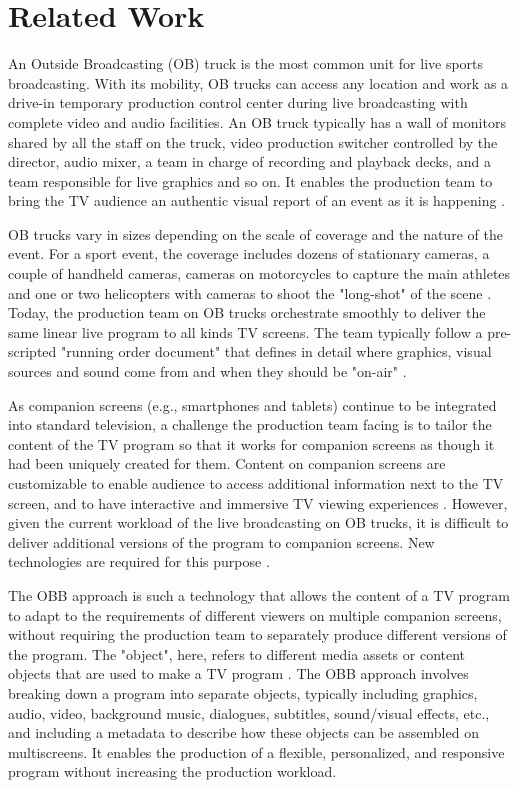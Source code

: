 \documentclass[sigchi-a, authorversion]{acmart}
\begin{document}
\section{Related Work}
An Outside Broadcasting (OB) truck is the most common unit for live sports
broadcasting. With its mobility, OB trucks can access any location and work as
a drive-in temporary production control center during live broadcasting with
complete video and audio facilities. An OB truck typically has a wall of monitors
shared by all the staff on the truck, video production switcher controlled by
the director, audio mixer, a team in charge of recording and playback decks, and
a team responsible for live graphics and so on. It enables the production team
to bring the TV audience an authentic visual report of an event as it is
happening \cite{owens2012, owens2015}.

OB trucks vary in sizes depending on the scale of coverage and the nature of the
event. For a sport event, the coverage includes dozens of stationary cameras, a
couple of handheld cameras, cameras on motorcycles to capture the main athletes
and one or two helicopters with cameras to shoot the "long-shot" of the
scene \cite{owens2012, Li:2018_TVX}. Today, the production team on OB trucks
orchestrate smoothly to deliver the same linear live program to all kinds TV
screens. The team typically follow a pre-scripted "running order document" that
defines in detail where graphics, visual sources and sound come from and when
they should be "on-air" \cite{Li:2018_TVX}.

As companion screens (e.g., smartphones and tablets) continue to be integrated
into standard television, a challenge the production team facing is to tailor
the content of the TV program so that it works for companion screens as though
it had been uniquely created for them. Content on companion screens are
customizable to enable audience to access additional information next to the TV
screen, and to have interactive and immersive TV viewing
experiences \cite{bentley2017, dowell2015}. However, given the current workload
of the live broadcasting on OB trucks, it is difficult to deliver additional
versions of the program to companion screens. New technologies are required for
this purpose \cite{Li:2018_TVX, armstrong2014}.

The OBB approach is such a technology that allows the content of a TV program to
adapt to the requirements of different viewers on multiple companion screens,
without requiring the production team to separately produce different versions
of the program. The "object", here, refers to different media assets or content
objects that are used to make a TV program \cite{armstrong2014}. The OBB approach
involves breaking down a program into separate objects, typically including
graphics, audio, video, background music, dialogues, subtitles, sound/visual
effects, etc., and including a metadata to describe how these objects can be
assembled on multiscreens. It enables the production of a flexible, personalized,
and responsive program without increasing the production
workload\cite{kegel2017, williams2016}.
\end{document}
